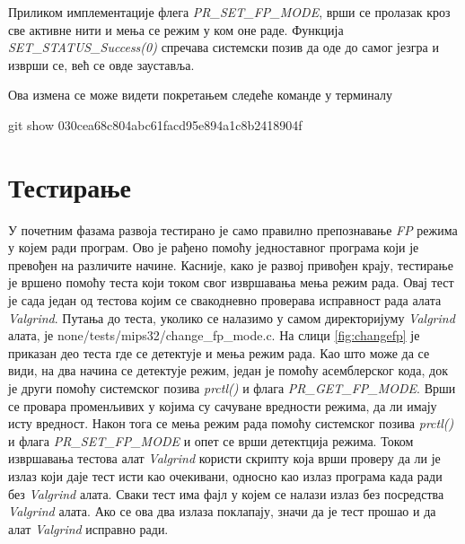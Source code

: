 \documentclass[12pt,oneside]{memoir}
\begin{document}
\indent Приликом имплементације флега \textit{PR\_SET\_FP\-\_MODE}, врши се пролазак кроз све активне нити и мења се режим у ком оне раде. Функција \textit{SET\-\_STATUS\_Success(0)} спречава системски позив да оде до самог језгра и изврши се, већ се овде зауставља.

Ова измена се може видети покретањем следеће команде у терминалу

\begin{center}
git show 030cea68c804abc61facd95e894a1c8b2418904f
\end{center}

\section{Тестирање}

\indent У почетним фазама развоја тестирано је само правилно препознавање \textit{FP} режима у којем ради програм. Ово је рађено помоћу једноставног програма који је превођен на различите начине. Касније, како је развој привођен крају, тестирање је вршено помоћу теста који током свог извршавања мења режим рада. Овај тест је сада један од тестова којим се свакодневно проверава исправност рада алата \textit{Valgrind}. Путања до теста, уколико се налазимо у самом директоријуму \textit{Valgrind} алата, је none/tests/mips32/change\_fp\_mode.c. На слици \ref{fig:changefp} је приказан део теста где се детектује и мења режим рада. Као што може да се види, на два начина се детектује режим, један је помоћу асемблерског кода, док је други помоћу системског позива \textit{prctl()} и флага \textit{PR\_GET\_FP\_MODE}. Врши се провара променљивих у којима су сачуване вредности режима, да ли имају исту вредност. Након тога се мења режим рада помоћу системског позива \textit{prctl()} и флага \textit{PR\_SET\_FP\_MODE} и опет се врши детектција режима. Током извршавања тестова алат \textit{Valgrind} користи скрипту која врши проверу да ли је излаз који даје тест исти као очекивани, односно као излаз програма када ради без \textit{Valgrind} алата. Сваки тест има фајл у којем се налази излаз без посредства \textit{Valgrind} алата. Ако се ова два излаза поклапају, значи да је тест прошао и да алат \textit{Valgrind} исправно ради.
\end{document}
